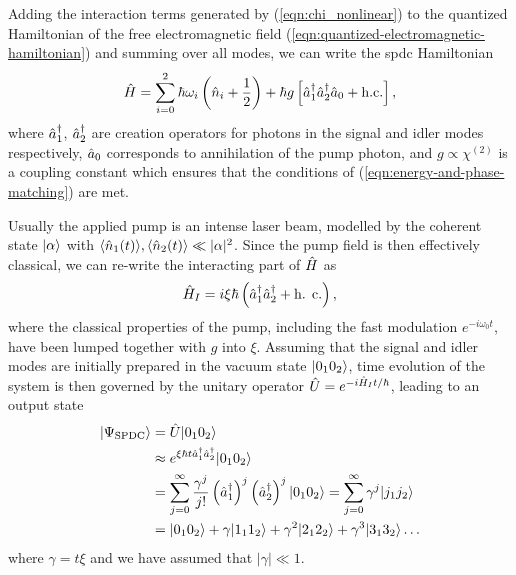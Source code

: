 Adding the interaction terms generated by (\ref{eqn:chi_nonlinear}) to the quantized Hamiltonian of the free electromagnetic field (\ref{eqn:quantized-electromagnetic-hamiltonian}) and summing over all modes, we can write the \gls{spdc} Hamiltonian \cite{Mandel1995} 
\begin{equation}
    \hat{H} = \sum_{i=0}^2 \hbar \omega_i \left(\hat{n}_i + \frac{1}{2}\right) + \hbar g \left[ \hat{a}^{\dagger}_1 \hat{a}^{\dagger}_2 \hat{a}_0 + \text{h.c.}\right] ,
\end{equation}
where $\hat{a}^{\dagger}_1$, $\hat{a}^{\dagger}_2$ are creation operators for photons in the signal and idler modes respectively, $\hat{a}_0$ corresponds to annihilation of the pump photon, and $g \propto \chi^{(2)}$ is a coupling constant which ensures that the conditions of (\ref{eqn:energy-and-phase-matching}) are met.

\newcommand{\spdc}{\ket{\Psi_\text{SPDC}}}
Usually the applied pump is an intense laser beam, modelled by the coherent state $\mbox{$ | \alpha \rangle $}$ with $\langle \hat{n}_1(t) \rangle, \langle \hat{n}_2(t) \rangle \ll |\alpha|^2$. Since the pump field is then effectively classical, we can re-write the interacting part of $\hat{H}$ as
\begin{equation}
    \hat{H}_I = i \xi \hbar \left( \hat{a}^{\dagger}_1 \hat{a}^{\dagger}_2 + \text{h. c.} \right),
\end{equation}
where the classical properties of the pump, including the fast modulation $e^{-i\omega_0 t}$, have been lumped together with $g$ into $\xi$. Assuming that the signal and idler modes are initially prepared in the vacuum state $\mbox{$ | 0_1 0_2 \rangle $}$, time evolution of the system is then governed by the unitary operator $\hat{U}=e^{-i\hat{H}_I t/\hbar}$, leading to an output state
\begin{align}
    \spdc
    &= \unitary  \ket{0_10_2}\\
    &\approx e^{\xi \hbar t \creation_1 \creation_2}\ket{0_10_2} \\
    &=\sum_{j=0}^\infty \frac{\gamma^j}{j!} 
    \left(\creation_1\right)^j
    \left(\creation_2\right)^j
    \ket{0_10_2} 
    = \sum_{j=0}^\infty \gamma^j \ket{j_1j_2}\\
    &= \ket{0_10_2} + \gamma  \ket{1_11_2} + \gamma^2 \ket{2_12_2} + \gamma^3 \ket{3_13_2} \ldots
    \label{eqn:spdc-state}
\end{align}
where $\gamma = t \xi$ and we have assumed that $|\gamma| \ll 1$. 

